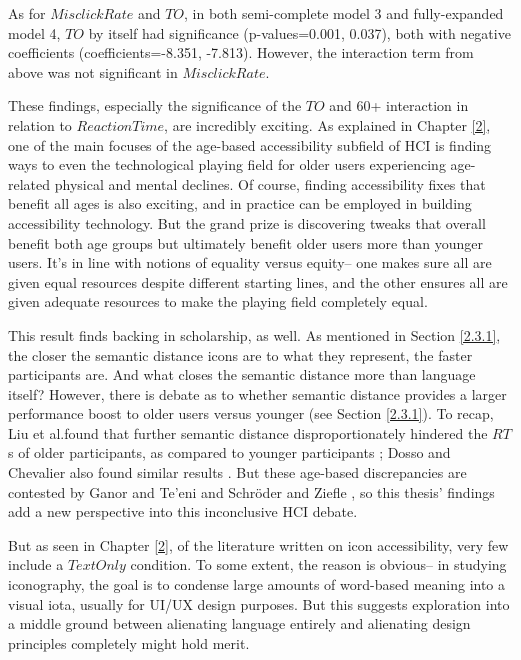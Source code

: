 \documentclass[12pt,twoside]{reedthesis}
\begin{document}
    As for $Misclick Rate$ and $TO$, in both semi-complete model 3 and fully-expanded model 4, $TO$ by itself had significance (p-values=0.001, 0.037), both with negative coefficients (coefficients=-8.351, -7.813). However, the interaction term from above was not significant in $Misclick Rate$.

    These findings, especially the significance of the $TO$ and 60+ interaction in relation to $ReactionTime$, are incredibly exciting. As explained in Chapter \ref{2}, one of the main focuses of the age-based accessibility subfield of HCI is finding ways to even the technological playing field for older users experiencing age-related physical and mental declines. Of course, finding accessibility fixes that benefit all ages is also exciting, and in practice can be employed in building accessibility technology. But the grand prize is discovering tweaks that overall benefit both age groups but ultimately benefit older users more than younger users. It's in line with notions of equality versus equity-- one makes sure all are given equal resources despite different starting lines, and the other ensures all are given adequate resources to make the playing field completely equal. 

    This result finds backing in scholarship, as well. As mentioned in Section \ref{2.3.1}, the closer the semantic distance icons are to what they represent, the faster participants are. And what closes the semantic distance more than language itself? However, there is debate as to whether semantic distance provides a larger performance boost to older users versus younger (see Section \ref{2.3.1}). To recap, Liu et al.\@ found that further semantic distance disproportionately hindered the $RT$s of older participants, as compared to younger participants \cite{liu_study_2023}; Dosso and Chevalier also found similar results \cite{dosso_how_2021}. But these age-based discrepancies are contested by Ganor and Te'eni \cite{ganor_designing_nodate} and Schröder and Ziefle \cite{schroder_effects_2008}, so this thesis' findings add a new perspective into this inconclusive HCI debate.

    But as seen in Chapter \ref{2}, of the literature written on icon accessibility, very few include a $TextOnly$ condition. To some extent, the reason is obvious-- in studying iconography, the goal is to condense large amounts of word-based meaning into a visual iota, usually for UI/UX design purposes. But this suggests exploration into a middle ground between alienating language entirely and alienating design principles completely might hold merit. 
\end{document}

